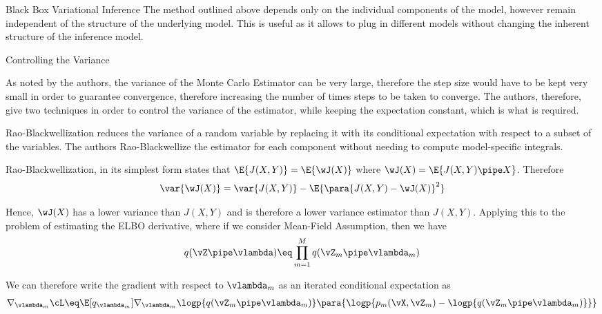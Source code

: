 \documentclass{article}
\begin{document}
\begin{question}
\begin{qsection}{Black Box Variational Inference}
		The method outlined above depends only on the individual components of the model, however remain independent of the structure of the underlying model. This is useful as it allows to plug in different models without changing the inherent structure of the inference model.

	\end{qsection}

	\begin{qsection}{Controlling the Variance}

		As noted by the authors, the variance of the Monte Carlo Estimator can be very large, therefore the step size would have to be kept very small in order to guarantee convergence, therefore increasing the number of times steps to be taken to converge. The authors, therefore, give two techniques in order to control the variance of the estimator, while keeping the expectation constant, which is what is required.

		\begin{enumerate}[label=\bt{\theenumi.}]
				Rao-Blackwellization reduces the variance of a random variable by replacing it with its conditional expectation with respect to a subset of the variables. The authors Rao-Blackwellize the estimator for each component without needing to compute model-specific integrals.

				Rao-Blackwellization, in its simplest form states that $\E{J(X, Y)} = \E{\wJ(X)}$ where $\wJ(X) = \E{J(X, Y) \pipe X}$. Therefore
				\begin{align*}
					\var{\wJ(X)} = \var{J(X, Y)} - \E{\para{J(X, Y) - \wJ(X)}^2}
				\end{align*}

				Hence, $\wJ(X)$ has a lower variance than $J(X, Y)$ and is therefore a lower variance estimator than $J(X, Y)$. Applying this to the problem of estimating the ELBO derivative, where if we consider Mean-Field Assumption, then we have
				\begin{align*}
					q(\vZ \pipe \vlambda) \eq \prod_{m = 1}^M q(\vZ_m \pipe \vlambda_m)
				\end{align*}

				We can therefore write the gradient with respect to $\vlambda_m$ as an iterated conditional expectation as
				\begin{align*}
					\nabla_{\vlambda_m} \cL \eq \E[q_{\vlambda_m}]{\nabla_{\vlambda_m} \logp{q(\vZ_m \pipe \vlambda_m)} \para{\logp{p_m(\vX, \vZ_m) - \logp{q(\vZ_m \pipe \vlambda_m)}}}}
				\end{align*}


\end{enumerate}
\end{qsection}
\end{question}
\end{document}
